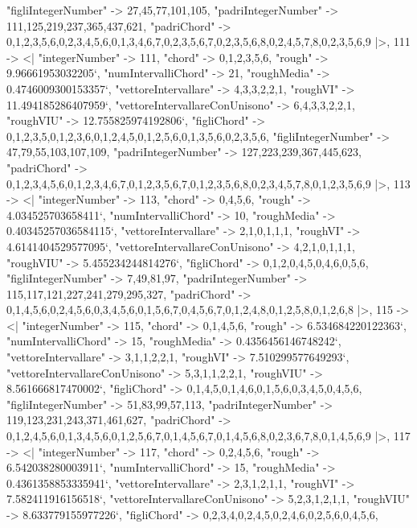 \documentclass[
]{article}
\begin{document}
\begin{DatasetVerbatim}
    "figliIntegerNumber" -> {27,45,77,101,105},
    "padriIntegerNumber" -> {111,125,219,237,365,437,621},
    "padriChord" -> {{0,1,2,3,5,6},{0,2,3,4,5,6},{0,1,3,4,6,7},{0,2,3,5,6,7},{0,2,3,5,6,8},{0,2,4,5,7,8},{0,2,3,5,6,9}}
  |>,
  111 -> <|
    "integerNumber" -> 111,
    "chord" -> {0,1,2,3,5,6},
    "rough" -> 9.96661953032205`,
    "numIntervalliChord" -> 21,
    "roughMedia" -> 0.4746009300153357`,
    "vettoreIntervallare" -> {4,3,3,2,2,1},
    "roughVI" -> 11.494185286407959`,
    "vettoreIntervallareConUnisono" -> {6,4,3,3,2,2,1},
    "roughVIU" -> 12.755825974192806`,
    "figliChord" -> {{0,1,2,3,5},{0,1,2,3,6},{0,1,2,4,5},{0,1,2,5,6},{0,1,3,5,6},{0,2,3,5,6}},
    "figliIntegerNumber" -> {47,79,55,103,107,109},
    "padriIntegerNumber" -> {127,223,239,367,445,623},
    "padriChord" -> {{0,1,2,3,4,5,6},{0,1,2,3,4,6,7},{0,1,2,3,5,6,7},{0,1,2,3,5,6,8},{0,2,3,4,5,7,8},{0,1,2,3,5,6,9}}
  |>,
  113 -> <|
    "integerNumber" -> 113,
    "chord" -> {0,4,5,6},
    "rough" -> 4.034525703658411`,
    "numIntervalliChord" -> 10,
    "roughMedia" -> 0.40345257036584115`,
    "vettoreIntervallare" -> {2,1,0,1,1,1},
    "roughVI" -> 4.6141404529577095`,
    "vettoreIntervallareConUnisono" -> {4,2,1,0,1,1,1},
    "roughVIU" -> 5.455234244814276`,
    "figliChord" -> {{0,1,2},{0,4,5},{0,4,6},{0,5,6}},
    "figliIntegerNumber" -> {7,49,81,97},
    "padriIntegerNumber" -> {115,117,121,227,241,279,295,327},
    "padriChord" -> {{0,1,4,5,6},{0,2,4,5,6},{0,3,4,5,6},{0,1,5,6,7},{0,4,5,6,7},{0,1,2,4,8},{0,1,2,5,8},{0,1,2,6,8}}
  |>,
  115 -> <|
    "integerNumber" -> 115,
    "chord" -> {0,1,4,5,6},
    "rough" -> 6.534684220122363`,
    "numIntervalliChord" -> 15,
    "roughMedia" -> 0.4356456146748242`,
    "vettoreIntervallare" -> {3,1,1,2,2,1},
    "roughVI" -> 7.510299577649293`,
    "vettoreIntervallareConUnisono" -> {5,3,1,1,2,2,1},
    "roughVIU" -> 8.561666817470002`,
    "figliChord" -> {{0,1,4,5},{0,1,4,6},{0,1,5,6},{0,3,4,5},{0,4,5,6}},
    "figliIntegerNumber" -> {51,83,99,57,113},
    "padriIntegerNumber" -> {119,123,231,243,371,461,627},
    "padriChord" -> {{0,1,2,4,5,6},{0,1,3,4,5,6},{0,1,2,5,6,7},{0,1,4,5,6,7},{0,1,4,5,6,8},{0,2,3,6,7,8},{0,1,4,5,6,9}}
  |>,
  117 -> <|
    "integerNumber" -> 117,
    "chord" -> {0,2,4,5,6},
    "rough" -> 6.542038280003911`,
    "numIntervalliChord" -> 15,
    "roughMedia" -> 0.4361358853335941`,
    "vettoreIntervallare" -> {2,3,1,2,1,1},
    "roughVI" -> 7.582411916156518`,
    "vettoreIntervallareConUnisono" -> {5,2,3,1,2,1,1},
    "roughVIU" -> 8.633779155977226`,
    "figliChord" -> {{0,2,3,4},{0,2,4,5},{0,2,4,6},{0,2,5,6},{0,4,5,6}},

\end{DatasetVerbatim}
\end{document}
